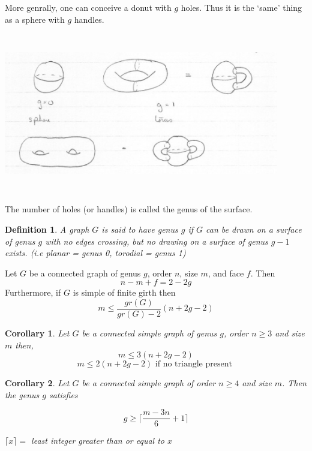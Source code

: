 \documentclass[12pt]{article}
\newenvironment{theorem}[1]{%
  \renewcommand\themanualtheoreminner{#1}%
  \manualtheoreminner
}{\endmanualtheoreminner}
\newtheorem*{corollary}{Corollary}
\newtheorem{definition}{Definition}
\begin{document}
More genrally, one can conceive a donut with $g$ holes.
Thus it is the `same' thing as a sphere with $g$ handles.

\begin{center}
	\includegraphics[width=12cm, height=7cm]{genusexample}
\end{center}


The number of holes (or handles) is called the genus of the surface.



\begin{definition}
	A graph $G$ is said to have genus $g$ if $G$ can be drawn on a surface of genus $g$ with no edges crossing, but no drawing on a surface of genus $g-1$ exists. (i.e planar = genus 0, torodial = genus 1)
\end{definition}



\begin{theorem}{8}
	Let $G$ be a connected graph of genus $g$, order $n$, size $m$, and face $f$. Then
	\[n - m + f = 2-2g\]
	Furthermore, if $G$ is simple of finite girth then
	\[m \le \frac{gr(G)}{gr(G) - 2} (n + 2g - 2)\]
\end{theorem}

\begin{corollary}
	Let $G$ be a connected simple graph of genus $g$, order $n\ge 3$ and size $m$ then,
	\[m \le 3(n+2g-2) \]
	\[m \le 2(n+2g-2) \text{ if no triangle present }\]
\end{corollary}


\begin{corollary}
	Let $G$ be a connected simple graph of order $n\ge 4$ and size $m$. Then the genus $g$ satisfies

	\[g \ge \lceil \frac{m-3n}{6} + 1 \rceil\]

	$\lceil x \rceil =$ least integer greater than or equal to $x$
\end{corollary}
\end{document}
